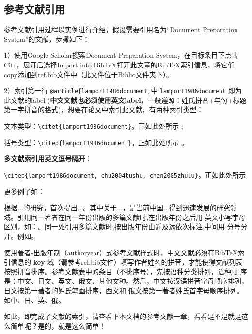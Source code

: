 \subsection{参考文献引用}
%

参考文献引用过程以实例进行介绍，假设需要引用名为``Document Preparation System''的文献，步骤如下：

1）使用Google Scholar搜索Document Preparation System，在目标条目下点击Cite，展开后选择Import into BibTeX打开此文章的BibTeX索引信息，将它们copy添加到ref.bib文件中（此文件位于Biblio文件夹下）。

2）索引第一行 \verb|@article{lamport1986document,|中 \verb|lamport1986document| 即为此文献的label (\textbf{中文文献也必须使用英文label}，一般遵照：姓氏拼音+年份+标题第一字拼音的格式)，想要在论文中索引此文献，有两种索引类型：

文本类型：\verb|\citet{lamport1986document}|。正如此处所示 \citet{lamport1986document}; 

括号类型：\verb|\citep{lamport1986document}|。正如此处所示 \citep{lamport1986document}。

\textbf{多文献索引用英文逗号隔开}：

\verb|\citep{lamport1986document, chu2004tushu, chen2005zhulu}|。正如此处所示 \citep{lamport1986document, chu2004tushu, chen2005zhulu}

更多例子如：

\citet{walls2013drought}根据...的研究，首次提出...。其中关于...\citep{walls2013drought}，是当前中国...得到迅速发展的研究领域\citep{chen1980zhongguo}。引用同一著者在同一年份出版的多篇文献时,在出版年份之后用
英文小写字母区别，如：\citep{yuan2012lana, yuan2012lanb, yuan2012lanc}。同一处引用多篇文献时,按出版年份由近及远依次标注,中间用
分号分开。例如\citep{chen1980zhongguo, stamerjohanns2009mathml, hls2012jinji, niu2013zonghe}。

使用著者-出版年制（authoryear）式参考文献样式时，中文文献必须在BibTeX索引信息的 \textbf{key} 域（请参考ref.bib文件）填写作者姓名的拼音，才能使得文献列表按照拼音排序。参考文献表中的条目（不排序号），先按语种分类排列，语种顺 序是：中文、日文、英文、俄文、其他文种。然后，中文按汉语拼音字母顺序排列，日文按第一著者的姓氏笔画排序，西文和 俄文按第一著者姓氏首字母顺序排列。如中\citep{niu2013zonghe}、日\citep{Bohan1928}、英\citep{stamerjohanns2009mathml}、俄\citep{Dubrovin1906}。

如此，即完成了文献的索引，请查看下本文档的参考文献一章，看看是不是就是这么简单呢？是的，就是这么简单！

